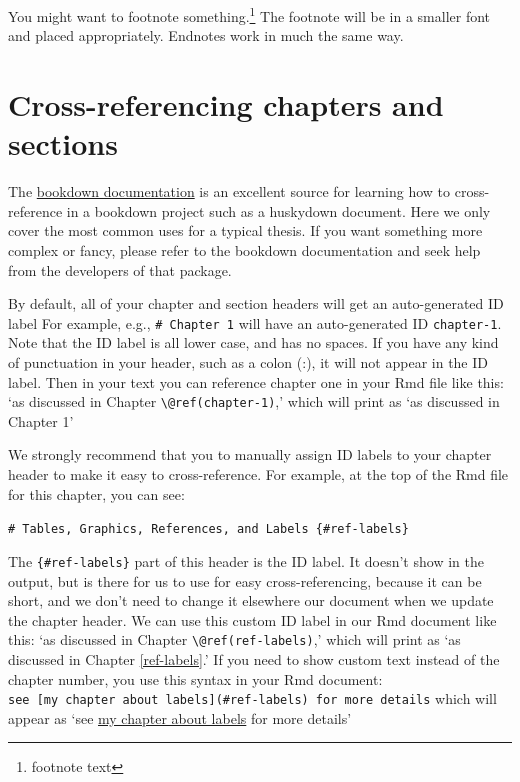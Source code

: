 \documentclass [11pt, proquest] {uwthesis}[2015/03/03]
\begin{document}
You might want to footnote something.\footnote{footnote text} The footnote will be in a smaller font and placed appropriately. Endnotes work in much the same way.

\hypertarget{cross-referencing-chapters-and-sections}{%
\section{Cross-referencing chapters and sections}\label{cross-referencing-chapters-and-sections}}

The \href{https://bookdown.org/yihui/bookdown/cross-references.html}{bookdown documentation} is an excellent source for learning how to cross-reference in a bookdown project such as a huskydown document. Here we only cover the most common uses for a typical thesis. If you want something more complex or fancy, please refer to the bookdown documentation and seek help from the developers of that package.

By default, all of your chapter and section headers will get an auto-generated ID label For example, e.g., \texttt{\#\ Chapter\ 1} will have an auto-generated ID \texttt{chapter-1}. Note that the ID label is all lower case, and has no spaces. If you have any kind of punctuation in your header, such as a colon (:), it will not appear in the ID label. Then in your text you can reference chapter one in your Rmd file like this: `as discussed in Chapter \texttt{\textbackslash{}@ref(chapter-1)},' which will print as `as discussed in Chapter 1'

We strongly recommend that you to manually assign ID labels to your chapter header to make it easy to cross-reference. For example, at the top of the Rmd file for this chapter, you can see:

\texttt{\#\ Tables,\ Graphics,\ References,\ and\ Labels\ \{\#ref-labels\}}

The \texttt{\{\#ref-labels\}} part of this header is the ID label. It doesn't show in the output, but is there for us to use for easy cross-referencing, because it can be short, and we don't need to change it elsewhere our document when we update the chapter header. We can use this custom ID label in our Rmd document like this: `as discussed in Chapter \texttt{\textbackslash{}@ref(ref-labels)},' which will print as `as discussed in Chapter \ref{ref-labels}.' If you need to show custom text instead of the chapter number, you use this syntax in your Rmd document: \texttt{see\ {[}my\ chapter\ about\ labels{]}(\#ref-labels)\ for\ more\ details} which will appear as `see \protect\hyperlink{ref-labels}{my chapter about labels} for more details'
\end{document}
